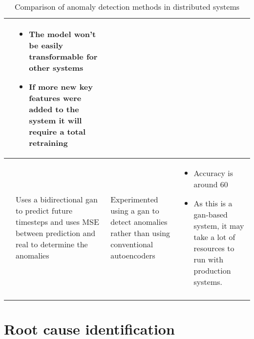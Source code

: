 \begin{longtable}{| p{2cm} | p{4cm} | p{4.5cm} | p{4.5cm} |}
\begin{itemize}[leftmargin=*,noitemsep,nolistsep]
  \end{itemize} &
  \vspace{-8mm}
  \begin{itemize}[leftmargin=*,noitemsep,nolistsep] 
    \item The model won't be easily transformable for other systems
    \item If more new key features were added to the system it will require a total retraining
  \end{itemize} \\ \hline
  \cite{kumarage2019generative} &
  Uses a bidirectional \ac{gan} to predict future timesteps and uses MSE between prediction and real to determine the anomalies &
  Experimented using a \ac{gan} to detect anomalies rather than using conventional autoencoders &
  \vspace{-8mm}
  \begin{itemize}[leftmargin=*,noitemsep,nolistsep] 
    \item Accuracy is around 60%
    \item As this is a \ac{gan}-based system, it may take a lot of resources to run with production systems.
  \end{itemize} \\ \hline
  \caption{Comparison of anomaly detection methods in distributed systems}
\end{longtable}

\section{Root cause identification}

